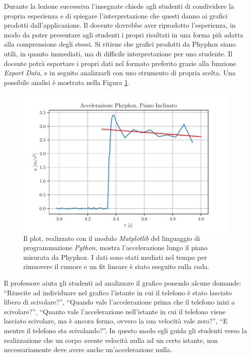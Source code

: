 \documentclass{report} \usepackage[T1]{fontenc} \usepackage[italian]{babel}
\begin{document}
Durante la lezione successiva l'insegnate chiede agli studenti
di condividere la propria esperienza e di spiegare l'interpretazione
che questi danno ai grafici prodotti dall'applicazione.
Il docente dovrebbe aver riprodotto l'esperienza, in modo
da poter presentare agli studenti i propri risultati in una
forma più adatta alla comprensione degli stessi.
Si ritiene che grafici prodotti da Phyphox siano utili,
in quanto immediati, ma di difficile interpretazione
per uno studente. Il docente potrà esportare i propri
dati nel formato preferito grazie alla funzione
\emph{Export Data}, e in seguito analizzarli con uno
strumento di propria scelta.
Una possibile analisi è mostrata nella Figura \ref{fig:a_phyphox}.
\begin{figure}[H]
\centering
  \includegraphics[width=\textwidth]{a_phyphox}
  \caption{Il plot, realizzato con il modulo \emph{Matplotlib}
           del linguaggio di programmazione \emph{Python},
           mostra l'accelerazione lungo il piano misurata da
           Phyphox. I dati sono stati mediati nel tempo
           per rimuovere il rumore e un fit lineare è stato
           eseguito sulla coda.
          }
  \label{fig:a_phyphox}
\end{figure}
Il professore aiuta gli studenti ad analizzare il grafico ponendo
alcune domande: ``Riuscite ad individuare nel grafico l'istante
in cui il telefono è stato lasciato libero di scivolare?'',
``Quando vale l'accelerazione prima che il telefono inizi a
scivolare?'', ``Quanto vale l'accelerazione nell'istante
in cui il telefono viene lasciato scivolare, ma è ancora fermo,
ovvero la sua velocità vale zero?'', ``E mentre il telefono sta
scivolando?''. In questo modo egli guida gli studenti verso
la realizzazione che un corpo avente velocità nulla ad un certo
istante, non necessariamente deve avere anche un'accelerazione nulla.
\end{document}
